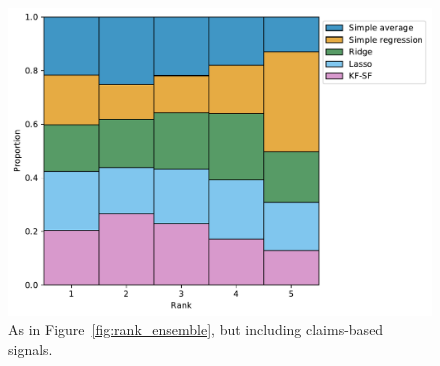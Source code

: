 \documentclass[sts]{imsart}
\theoremstyle{plain}
\theoremstyle{definition}
\theoremstyle{remark}
\begin{document}
\begin{appendix}
\begin{figure}[tb]
\centering
\includegraphics[width=0.95\linewidth]{./figures/rankplot_fusion_claims.pdf}
\caption{As in Figure~\ref{fig:rank_ensemble}, but including claims-based
  signals.} 
\label{fig:rank_ensemble_claims}
\end{figure}





\end{appendix}
\end{document}
